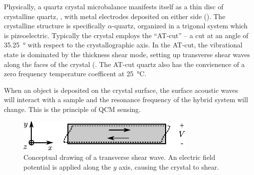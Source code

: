 Physically, a quartz crystal microbalance manifests itself as a thin disc
of crystalline quartz, , with metal electrodes deposited on either
side ().  The crystalline structure is specifically
$\alpha$-quartz, organized in a trigonal system which is pizeoelectric.
Typically the crystal employs the ``AT-cut'' -- a cut at an angle of
\SI{35.25}{\degree} with respect to the crystallographic axis.  In the
AT-cut, the vibrational state is dominated by the thickness shear mode,
setting up transverse shear waves along the faces of the crystal
(.  The AT-cut quartz also has the convienence of
a zero frequency temperature coefficent at \SI{25}{\celsius}.

When an object is deposited on the crystal surface, the surface acoustic
waves will interact with a sample and the resonance frequency of the hybrid
system will change.  This is the principle of QCM sensing.
\begin{figure}[ht]
 \centering
 	\includegraphics[keepaspectratio]{qcm/figures/qcm_shearmode.pdf}
	\caption{Conceptual drawing of a transverse shear wave.  An electric
	field potential is applied along the $y$ axis, causing the crystal to
	shear.}
 \label{fig:qcmshearwave}
\end{figure}
